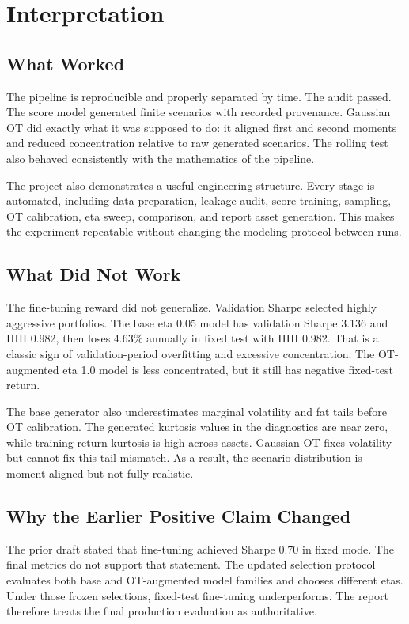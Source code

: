 \documentclass{article}
\begin{document}
\section{Interpretation}

\subsection{What Worked}

The pipeline is reproducible and properly separated by time. The audit passed.
The score model generated finite scenarios with recorded provenance. Gaussian OT
did exactly what it was supposed to do: it aligned first and second moments and
reduced concentration relative to raw generated scenarios. The rolling test also
behaved consistently with the mathematics of the pipeline.

The project also demonstrates a useful engineering structure. Every stage is
automated, including data preparation, leakage audit, score training, sampling,
OT calibration, eta sweep, comparison, and report asset generation. This makes
the experiment repeatable without changing the modeling protocol between runs.

\subsection{What Did Not Work}

The fine-tuning reward did not generalize. Validation Sharpe selected highly
aggressive portfolios. The base eta 0.05 model has validation Sharpe 3.136 and
HHI 0.982, then loses 4.63\% annually in fixed test with HHI 0.982. That is a
classic sign of validation-period overfitting and excessive concentration. The
OT-augmented eta 1.0 model is less concentrated, but it still has negative
fixed-test return.

The base generator also underestimates marginal volatility and fat tails before
OT calibration. The generated kurtosis values in the diagnostics are near zero,
while training-return kurtosis is high across assets. Gaussian OT fixes
volatility but cannot fix this tail mismatch. As a result, the scenario
distribution is moment-aligned but not fully realistic.

\subsection{Why the Earlier Positive Claim Changed}

The prior draft stated that fine-tuning achieved Sharpe 0.70 in fixed mode. The
final metrics do not support that statement. The updated selection protocol
evaluates both base and OT-augmented model families and chooses different etas.
Under those frozen selections, fixed-test fine-tuning underperforms. The report
therefore treats the final production evaluation as authoritative.
\end{document}
